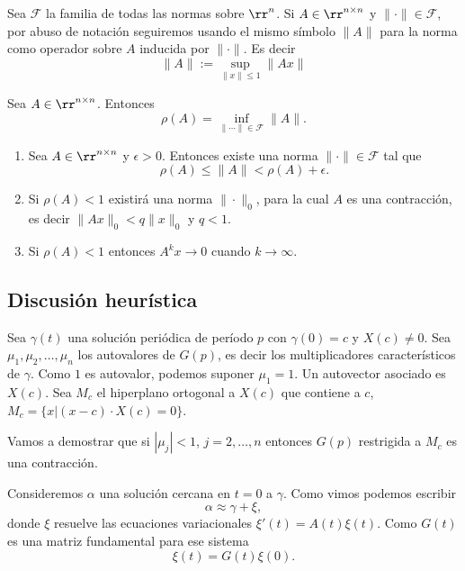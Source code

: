 Sea $\mathcal{F}$ la familia de todas las normas sobre $\rr^n$. Si $A\in\rr^{n\times n}$ y $\|\cdot \|\in\mathcal{F}$, 
por abuso de notación seguiremos usando el mismo símbolo $\|A\|$ para la norma como operador sobre $A$ inducida por 
$\|\cdot\|$. Es decir
\[\|A\|:=\sup_{\|x\|\leq 1} \|Ax\|\]


\begin{teorema}



  Sea $A\in\rr^{n\times n}$. Entonces
\[  \rho(A)=\inf_{\|\cdots\|\in\mathcal{F}}\|A \|. \]

\end{teorema}

\begin{corolario}





\begin{enumerate}
 \item Sea $A\in\rr^{n\times n}$ y $\epsilon>0$. Entonces existe una norma $\| \cdot\|\in\mathcal{F}$ tal que
\[  \rho(A)\leq \|A\|<\rho(A)+\epsilon.\]
\item Si $\rho(A)<1$ existirá una norma $\|\cdot\|_0$, para la cual $A$ es una contracción, es decir $\|Ax\|_0<q\|x\|_0$ y $q<1$. 

\item Si $\rho(A)<1$ entonces $A^kx\to 0$ cuando $k\to\infty$.
\end{enumerate}

\end{corolario}

 

\subsection{Discusión heurística}
Sea $\gamma(t)$ una solución periódica de período $p$ con $\gamma(0)=c$ y $X(c)\neq 0$. Sea $\mu_1,\mu_2,\dots,\mu_n$ los autovalores de $G(p)$, 
es decir los
multiplicadores característicos de $\gamma$. Como $1$ es autovalor, podemos suponer $\mu_1=1$. Un autovector asociado es $X(c)$. Sea $M_c$ el hiperplano ortogonal a $X(c)$
que contiene a $c$, $M_c=\{x|(x-c)\cdot X(c)=0\}$. 

Vamos a demostrar  que si $|\mu_j|<1$, $j=2,\ldots,n$ entonces $G(p)$ restrigida a $M_c$ es una contracción.

Consideremos $\alpha$ una solución cercana en $t=0$ a $\gamma$. Como vimos podemos escribir 
\begin{equation}\label{ecuaaprox}
 \alpha\approx \gamma+\xi,
\end{equation}
 donde $\xi$ resuelve las ecuaciones 
variacionales $\xi'(t)=A(t)\xi(t)$. Como $G(t)$ es una matriz fundamental para ese sistema 
\begin{equation}\label{ecuavar}
 \xi(t)=G(t)\xi(0). 
\end{equation}





